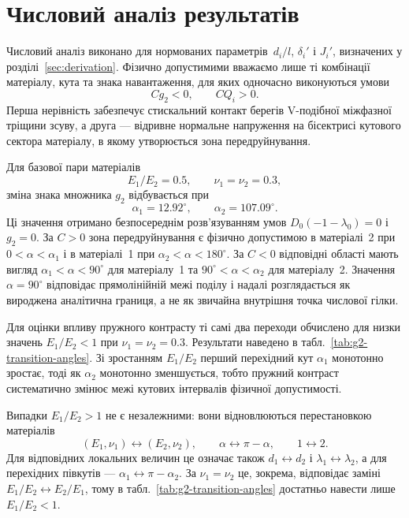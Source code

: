 \section{Числовий аналіз результатів}
\label{sec:numerical-results}

Числовий аналіз виконано для нормованих параметрів
$\,d_i/l$, $\delta_i'$ і $J_i'$, визначених у
розділі~\ref{sec:derivation}. Фізично допустимими вважаємо лише ті
комбінації матеріалу, кута та знака навантаження, для яких одночасно
виконуються умови
\begin{equation*}
  Cg_2<0,\qquad CQ_i>0.
\end{equation*}
Перша нерівність забезпечує стискальний контакт берегів V-подібної
міжфазної тріщини зсуву, а друга --- відривне нормальне напруження на бісектрисі кутового сектора матеріалу, в якому
утворюється зона передруйнування.

Для базової пари матеріалів
\begin{equation*}
  E_1/E_2=0.5,\qquad \nu_1=\nu_2=0.3,
\end{equation*}
зміна знака множника $g_2$ відбувається при
\begin{equation*}
  \alpha_1=12.92^\circ,\qquad
  \alpha_2=107.09^\circ.
\end{equation*}
Ці значення отримано безпосереднім розв'язуванням умов
$D_0(-1-\lambda_0)=0$ і $g_2=0$. За $C>0$ зона передруйнування є фізично
допустимою в матеріалі~2 при $0<\alpha<\alpha_1$ і в матеріалі~1 при
$\alpha_2<\alpha<180^\circ$. За $C<0$ відповідні області мають вигляд
$\alpha_1<\alpha<90^\circ$ для матеріалу~1 та
$90^\circ<\alpha<\alpha_2$ для матеріалу~2. Значення
$\alpha=90^\circ$ відповідає прямолінійній межі поділу і надалі
розглядається як вироджена аналітична границя, а не як звичайна внутрішня
точка числової гілки.

Для оцінки впливу пружного контрасту ті самі два переходи обчислено для
низки значень $E_1/E_2<1$ при $\nu_1=\nu_2=0.3$. Результати наведено в
табл.~\ref{tab:g2-transition-angles}. Зі зростанням $E_1/E_2$ перший
перехідний кут $\alpha_1$ монотонно зростає, тоді як $\alpha_2$
монотонно зменшується, тобто пружний контраст систематично змінює межі
кутових інтервалів фізичної допустимості.



Випадки $E_1/E_2>1$ не є незалежними: вони відновлюються перестановкою
матеріалів
\begin{equation*}
  (E_1,\nu_1)\leftrightarrow(E_2,\nu_2),
  \qquad
  \alpha\leftrightarrow\pi-\alpha,
  \qquad
  1\leftrightarrow2.
\end{equation*}
Для відповідних локальних величин це означає також
$d_1\leftrightarrow d_2$ і $\lambda_1\leftrightarrow\lambda_2$, а для
перехідних півкутів ---
$\alpha_1\leftrightarrow\pi-\alpha_2$. За $\nu_1=\nu_2$ це, зокрема,
відповідає заміні
$E_1/E_2\leftrightarrow E_2/E_1$, тому в табл.~\ref{tab:g2-transition-angles}
достатньо навести лише $E_1/E_2<1$.

